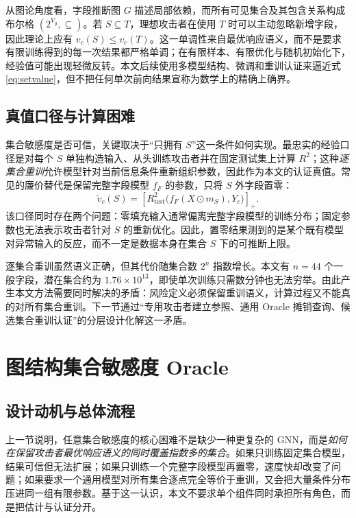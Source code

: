 \documentclass[UTF8,a4paper,zihao=5,fontset=fandol]{ctexart}
\begin{document}
从图论角度看，字段推断图 $G$ 描述局部依赖，而所有可见集合及其包含关系构成布尔格 $(2^{V_g},\subseteq)$。若 $S\subseteq T$，理想攻击者在使用 $T$ 时可以主动忽略新增字段，因此理论上应有 $v_c(S)\le v_c(T)$。这一单调性来自最优响应语义，而不是要求有限训练得到的每一次结果都严格单调；在有限样本、有限优化与随机初始化下，经验值可能出现轻微反转。本文后续使用多模型结构、微调和重训认证来逼近式\eqref{eq:setvalue}，但不把任何单次前向结果宣称为数学上的精确上确界。

\subsection{真值口径与计算困难}

集合敏感度是否可信，关键取决于“只拥有 $S$”这一条件如何实现。最忠实的经验口径是对每个 $S$ 单独构造输入、从头训练攻击者并在固定测试集上计算 $R^2$；这种\emph{逐集合重训}允许模型针对当前信息条件重新组织参数，因此作为本文的认证真值。常见的廉价替代是保留完整字段模型 $f_F$ 的参数，只将 $S$ 外字段置零：
\begin{equation}
  \widetilde v_c(S)=
  \left[R^2_{\mathrm{test}}\bigl(f_F(X\odot m_S),Y_c\bigr)\right]_+.
\end{equation}
该口径同时存在两个问题：零填充输入通常偏离完整字段模型的训练分布；固定参数也无法表示攻击者针对 $S$ 的重新优化。因此，置零结果测到的是某个既有模型对异常输入的反应，而不一定是数据本身在集合 $S$ 下的可推断上限。

逐集合重训虽然语义正确，但其代价随集合数 $2^n$ 指数增长。本文有 $n=44$ 个一般字段，潜在集合约为 $1.76\times10^{13}$，即使单次训练只需数分钟也无法穷举。由此产生本文方法需要同时解决的矛盾：风险定义必须保留重训语义，计算过程又不能真的对所有集合重训。下一节通过“专用攻击者建立参照、通用 Oracle 摊销查询、候选集合重训认证”的分层设计化解这一矛盾。

\section{图结构集合敏感度 Oracle}

\subsection{设计动机与总体流程}

上一节说明，任意集合敏感度的核心困难不是缺少一种更复杂的 GNN，而是\emph{如何在保留攻击者最优响应语义的同时覆盖指数多的集合}。如果只训练固定集合模型，结果可信但无法扩展；如果只训练一个完整字段模型再置零，速度快却改变了问题；如果要求一个通用模型对所有集合逐点完全等价于重训，又会把大量条件分布压进同一组有限参数。基于这一认识，本文不要求单个组件同时承担所有角色，而是把估计与认证分开。
\end{document}
